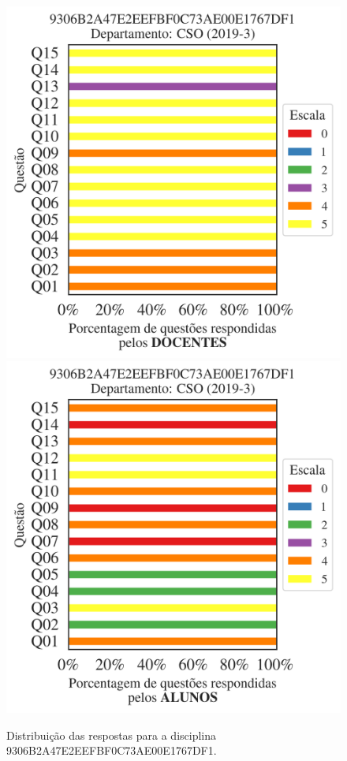 \documentclass[a4paper,10pt]{article}
\begin{document}
\begin{figure}[h]
\centering
\includegraphics[width=0.485\linewidth]{analise_disciplina_departamento_CSO_9306B2A47E2EEFBF0C73AE00E1767DF1_docentes.png}
\includegraphics[width=0.485\linewidth]{analise_disciplina_departamento_CSO_9306B2A47E2EEFBF0C73AE00E1767DF1_alunos.png}
\caption{\label{fig:analise_geral_departamento}                Distribuição das respostas para a disciplina 9306B2A47E2EEFBF0C73AE00E1767DF1. }
\end{figure}
\end{document}
